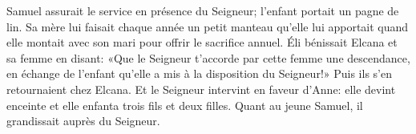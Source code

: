 Samuel assurait le service en présence du Seigneur;
	l’enfant portait un pagne de lin.
Sa mère lui faisait chaque année un petit manteau
	qu’elle lui apportait quand elle montait avec son mari
		pour offrir le sacrifice annuel.
Éli bénissait Elcana et sa femme en disant:
	«Que le Seigneur t’accorde par cette femme une descendance,
	en échange de l’enfant qu’elle a mis à la disposition du Seigneur!»
Puis ils s’en retournaient chez Elcana.
Et le Seigneur intervint en faveur d’Anne:
	elle devint enceinte et elle enfanta trois fils et deux filles.
Quant au jeune Samuel, il grandissait auprès du Seigneur.

